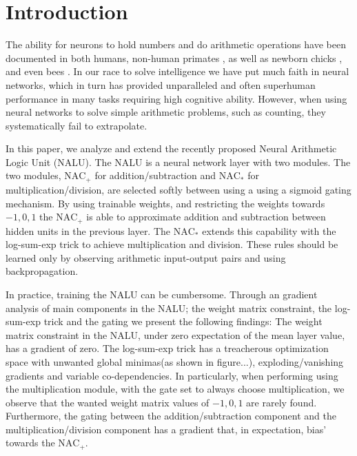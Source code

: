 \section{Introduction}

The ability for neurons to hold numbers and do arithmetic operations have been documented in both humans, non-human primates \cite{nieder-neuronal-number}, as well as newborn chicks \cite{rugani-arithmetic-chicks}, and even bees \cite{gallistel-numbers-in-brain}.
In our race to solve intelligence we have put much faith in neural networks, which in turn has provided unparalleled and often superhuman performance in many tasks requiring high cognitive ability\cite{natureGo,googleNMT,resnet}.
However, when using neural networks to solve simple arithmetic problems, such as counting, they systematically fail to extrapolate\cite{stillNotSystematic,suzgun2019evaluating,trask-nalu}.

In this paper, we analyze and extend the recently proposed Neural Arithmetic Logic Unit (NALU)\cite{trask-nalu}.
The NALU is a neural network layer with two modules.
The two modules, $\text{NAC}_{\text{+}}$ for addition/subtraction and $\text{NAC}_{\text{*}}$ for multiplication/division, are selected softly between using a using a sigmoid gating mechanism.
By using trainable weights, and restricting the weights towards ${-1,0,1}$ the $\text{NAC}_{\text{+}}$ is able to approximate addition and subtraction between hidden units in the previous layer.
The $\text{NAC}_{\text{*}}$ extends this capability with the log-sum-exp trick to achieve multiplication and division.
These rules should be learned only by observing arithmetic input-output pairs and using backpropagation\cite{rumelhart1986learning}.

In practice, training the NALU can be cumbersome.
Through an gradient analysis of main components in the NALU; the weight matrix constraint, the log-sum-exp trick and the gating we present the following findings:
The weight matrix constraint in the NALU, under zero expectation of the mean layer value\cite{glorot-initialization}, has a gradient of zero.
The log-sum-exp trick has a treacherous optimization space with unwanted global minimas(as shown in figure...), exploding/vanishing gradients and variable co-dependencies.
In particularly, when performing using the multiplication module, with the gate set to always choose multiplication, we observe that the wanted weight matrix values of ${-1, 0, 1}$ are rarely found.
Furthermore, the gating between the addition/subtraction component and the multiplication/division component has a gradient that, in expectation, bias' towards the $\text{NAC}_{\text{+}}$.

